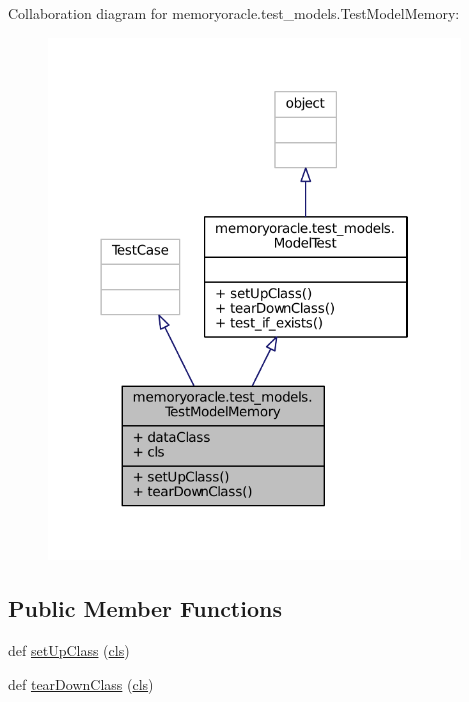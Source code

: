 Collaboration diagram for memoryoracle.\+test\+\_\+models.\+Test\+Model\+Memory\+:\nopagebreak
\begin{figure}[H]
\begin{center}
\leavevmode
\includegraphics[width=310pt]{classmemoryoracle_1_1test__models_1_1TestModelMemory__coll__graph}
\end{center}
\end{figure}
\subsection*{Public Member Functions}
\begin{DoxyCompactItemize}
\item 
def \hyperlink{classmemoryoracle_1_1test__models_1_1TestModelMemory_a5ce43527227be266fce15eb18de632d6}{set\+Up\+Class} (\hyperlink{classmemoryoracle_1_1test__models_1_1TestModelMemory_ae97c5c7239cba6be9daa3e41b8d242e8}{cls})
\item 
def \hyperlink{classmemoryoracle_1_1test__models_1_1TestModelMemory_a12ae939d003744bff19e109cb92ff5ba}{tear\+Down\+Class} (\hyperlink{classmemoryoracle_1_1test__models_1_1TestModelMemory_ae97c5c7239cba6be9daa3e41b8d242e8}{cls})
\end{DoxyCompactItemize}
